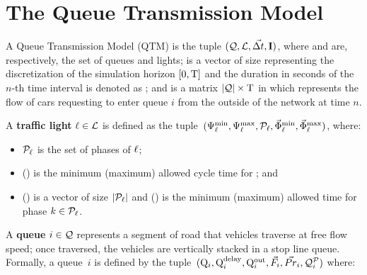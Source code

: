 \section{The Queue Transmission Model}



A Queue Transmission Model (QTM) is the tuple $(\mathcal{Q}, \mathcal{L}, \vec{\Delta t}, \mathbf{I})$,
where \Qset and \Lset are, respectively, the set of queues and lights;
%
\vecDT is a vector of size \Nn representing the discretization of the simulation
horizon $[0,\mathrm{T}]$ and the duration in seconds of the $n$-th time interval is
denoted as \DT[n];
%
%
and \MatQIN is a matrix $|\mathcal{Q}| \times \mathrm{T}$ in which  represents
the flow of cars requesting to enter queue $i$ from the outside of the network
at time $n$.



A \textbf{traffic light} $\ell \in \mathcal{L}$ is defined as the tuple~$(\mathrm{\Psi}_{\ell}^{\mathrm{min}},
\mathrm{\Psi}_{\ell}^{\mathrm{max}}, \mathcal{P}_\ell, \vec{\mathrm{\Phi}}_{\ell}^{\mathrm{min}}, \vec{\mathrm{\Phi}}_{\ell}^{\mathrm{max}})$, where:

\begin{itemize}
%
\item $\mathcal{P}_\ell$ is the set of phases of $\ell$;
%
\item \CTMIN{\tl} (\CTMAX{\tl}) is the minimum (maximum) allowed cycle time for
  \tl; and
%
\item \VecPTMIN{\tl} (\VecPTMAX{\tl}) is a vector of size $|\mathcal{P}_\ell|$ and
   () is the minimum (maximum) allowed time for
  phase $k \in \mathcal{P}_\ell$. 
%
\end{itemize}


A \textbf{queue} $i \in \mathcal{Q}$ represents a segment of road that vehicles
traverse at free flow speed; once traversed, the vehicles are vertically stacked
in a stop line queue.
%
Formally, a queue~$i$ is defined by the tuple~$(\mathrm{Q}_{i}, \mathrm{Q}_{i}^{\mathrm{delay}}, \mathrm{Q}_{i}^{\mathrm{out}},
\vec{F}_i, \vec{Pr}_i, \mathcal{Q}_{i}^{\mathcal{P}})$ where:

